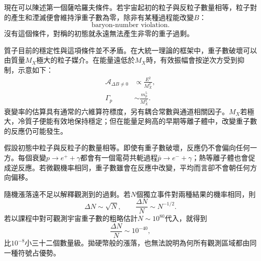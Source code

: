 現在可以陳述第一個薩哈羅夫條件。若宇宙起初的粒子與反粒子數量相等，粒子對的產生和湮滅便會維持淨重子數為零，除非有某種過程能改變\(B\)：
\begin{equation}
\boxed{\text{baryon-number violation}.}
\end{equation}
沒有這個條件，對稱的初態就永遠無法產生非零的重子過剩。

質子目前的穩定性與這項條件並不矛盾。在大統一理論的框架中，重子數破壞可以由質量\(M_X\)極大的粒子媒介。在能量遠低於\(M_X\)時，有效振幅會按逆次方受到抑制，示意如下：
\begin{equation}
\begin{aligned}
\mathcal A_{\Delta B\ne0}&\propto \frac{E^2}{M_X^2},\\
\Gamma_p&\sim \frac{m_p^5}{M_X^4}.
\end{aligned}
\label{eq:c08-heavy-suppression}
\end{equation}
衰變率的估算具有通常的六維算符標度，另有耦合常數與通道相關因子。\(M_X\)若極大，冷質子便能有效地保持穩定；但在能量足夠高的早期等離子體中，改變重子數的反應仍可能發生。

\begin{classroomqa}
\end{classroomqa}

假設初態中粒子與反粒子的數量相等。即使有重子數破壞，反應仍不會偏向任何一方。每個衰變\(p\to e^++\gamma\)都會有一個電荷共軛過程\(\bar p\to e^-+\gamma\)；熱等離子體也會促成逆反應。若微觀機率相同，重子數雖會在反應中改變，平均而言卻不會朝任何方向偏移。

\begin{classroomqa}
\end{classroomqa}

隨機漲落遠不足以解釋觀測到的過剩。若\(N\)個獨立事件對兩種結果的機率相同，則
\begin{equation}
\Delta N\sim\sqrt N,
\qquad
\frac{\Delta N}{N}\sim N^{-1/2}.
\end{equation}
若以課程中對可觀測宇宙重子數的粗略估計\(N\sim10^{80}\)代入，就得到
\begin{equation}
\frac{\Delta N}{N}\sim10^{-40},
\end{equation}
比\(10^{-8}\)小三十二個數量級。拋硬幣般的漲落，也無法說明為何所有觀測區域都由同一種符號占優勢。

